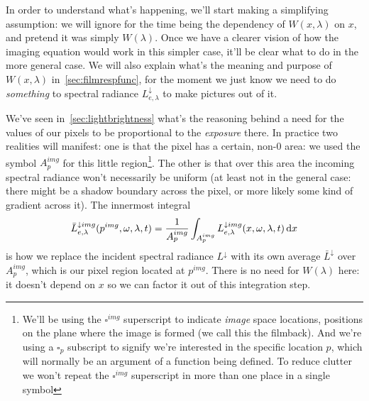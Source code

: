 In order to understand what's happening, we'll start making a simplifying assumption:
we will ignore for the time being the dependency of $W(x,\lambda)$ on $x$, and pretend it was simply
$W(\lambda)$. Once we have a clearer vision of how the imaging equation would work in this
simpler case, it'll be clear what to do in the more general case. We will also explain
what's the meaning and purpose of $W(x,\lambda)$ in~\cref{sec:filmrespfunc}, for the moment we just know we need to do
\emph{something} to \gls{spectral} \gls{radiance} $L^{\downarrow}_{e,\lambda}$ to make
pictures out of it.

We've seen in~\cref{sec:lightbrightness} what's the reasoning behind a need for the values 
of our pixels to be proportional to the \textsl{ \gls{exposure}} there. 
In practice two realities will manifest: one is that the pixel has a certain, 
non-$0$ area: we used the symbol $A^{img}_p$ for this little region\footnote{
	We'll be using the $\square^{img}$ superscript to indicate \textsl{\gls{image}} space 
	locations, positions on the plane where the image is formed (we call this 
	the \gls{filmback}). And we're using a $\square_p$ subscript to signify we're 
	interested in the specific location $p$, which will normally be an argument of a 
	function being defined. To reduce clutter we won't repeat the $\square^{img}$ 
	superscript in more than one place in a single symbol}. 
The other is that over this area the incoming \gls{spectral} 
\gls{radiance} won't necessarily be uniform (at least not in the general case: 
there might be a shadow boundary across the pixel, or more likely some kind of 
gradient across it). 
The innermost integral
\begin{displaymath}
	\bar L^{\downarrow img}_{e,\lambda}(p^{img}, \omega, \lambda, t) = \frac1{A_p^{img}} \int_{A_p^{img}} L^{\downarrow img}_{e,\lambda}(x, \omega, \lambda, t) \mathop{}\!\mathrm{d} x
\end{displaymath}
is how we replace the incident \gls{spectral} \gls{radiance} $L^{\downarrow}$ with 
its own average $\bar L^{\downarrow}$ over $A^{img}_p$, which is our pixel region located at $p^{img}$. 
There is no need for $W(\lambda)$ here: it doesn't depend on $x$ so we can factor it 
out of this integration step.

